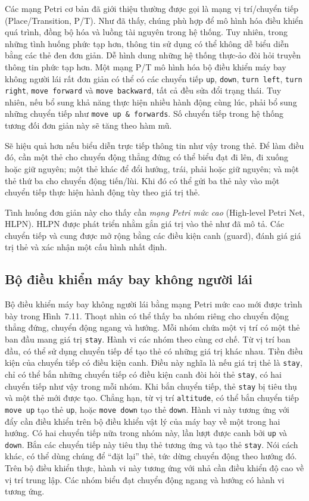 Các mạng Petri cơ bản đã giới thiệu thường được gọi là mạng vị trí/chuyển tiếp (Place/Transition, P/T). Như đã thấy, chúng phù hợp để mô hình hóa điều khiển quá trình, đồng bộ hóa và luồng tài nguyên trong hệ thống. Tuy nhiên, trong những tình huống phức tạp hơn, thông tin sử dụng có thể không dễ biểu diễn bằng các thẻ đen đơn giản. Dễ hình dung những hệ thống thực-ảo đòi hỏi truyền thông tin phức tạp hơn. Một mạng P/T mô hình hóa bộ điều khiển máy bay không người lái rất đơn giản có thể có các chuyển tiếp \texttt{up}, \texttt{down}, \texttt{turn left}, \texttt{turn right}, \texttt{move forward} và \texttt{move backward}, tất cả đều sửa đổi trạng thái. Tuy nhiên, nếu bổ sung khả năng thực hiện nhiều hành động cùng lúc, phải bổ sung những chuyển tiếp như \texttt{move up \& forwards}. Số chuyển tiếp trong hệ thống tương đối đơn giản này sẽ tăng theo hàm mũ.

Sẽ hiệu quả hơn nếu biểu diễn trực tiếp thông tin như vậy trong thẻ. Để làm điều đó, cần một thẻ cho chuyển động thẳng đứng có thể biểu đạt đi lên, đi xuống hoặc giữ nguyên; một thẻ khác để đổi hướng, trái, phải hoặc giữ nguyên; và một thẻ thứ ba cho chuyển động tiến/lùi. Khi đó có thể gửi ba thẻ này vào một chuyển tiếp thực hiện hành động tùy theo giá trị thẻ.

Tình huống đơn giản này cho thấy cần \emph{mạng Petri mức cao} (High-level Petri Net, HLPN). HLPN được phát triển nhằm gắn giá trị vào thẻ như đã mô tả. Các chuyển tiếp và cung được mở rộng bằng các điều kiện canh (guard), đánh giá giá trị thẻ và xác nhận một cấu hình nhất định.

\subsection{Bộ điều khiển máy bay không người lái}
Bộ điều khiển máy bay không người lái bằng mạng Petri mức cao mới được trình bày trong Hình~7.11. Thoạt nhìn có thể thấy ba nhóm riêng cho chuyển động thẳng đứng, chuyển động ngang và hướng. Mỗi nhóm chứa một vị trí có một thẻ ban đầu mang giá trị \texttt{stay}. Hành vi các nhóm theo cùng cơ chế. Từ vị trí ban đầu, có thể sử dụng chuyển tiếp để tạo thẻ có những giá trị khác nhau. Tiền điều kiện của chuyển tiếp có điều kiện canh. Điều này nghĩa là nếu giá trị thẻ là \texttt{stay}, chỉ có thể bắn những chuyển tiếp có điều kiện canh đòi hỏi thẻ \texttt{stay}, có hai chuyển tiếp như vậy trong mỗi nhóm. Khi bắn chuyển tiếp, thẻ \texttt{stay} bị tiêu thụ và một thẻ mới được tạo. Chẳng hạn, từ vị trí \texttt{altitude}, có thể bắn chuyển tiếp \texttt{move up} tạo thẻ \texttt{up}, hoặc \texttt{move down} tạo thẻ \texttt{down}. Hành vi này tương ứng với đẩy cần điều khiển trên bộ điều khiển vật lý của máy bay về một trong hai hướng. Có hai chuyển tiếp nữa trong nhóm này, lần lượt được canh bởi \texttt{up} và \texttt{down}. Bắn các chuyển tiếp này tiêu thụ thẻ tương ứng và tạo thẻ \texttt{stay}. Nói cách khác, có thể dùng chúng để ``đặt lại'' thẻ, tức dừng chuyển động theo hướng đó. Trên bộ điều khiển thực, hành vi này tương ứng với nhả cần điều khiển độ cao về vị trí trung lập. Các nhóm biểu đạt chuyển động ngang và hướng có hành vi tương ứng.


